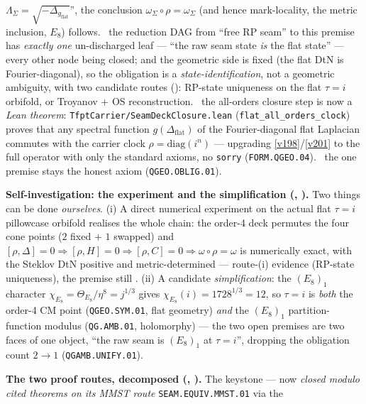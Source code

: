 $\Lambda_\Sigma=\sqrt{-\Delta_{g_{\mathrm{flat}}}}$'', the conclusion $\omega_\Sigma\circ\rho=\omega_\Sigma$ (and
hence mark-locality, the metric inclusion, $E_8$) follows. \mE\ the reduction DAG from ``free RP seam'' to this
premise has \emph{exactly one} un-discharged leaf --- ``the raw seam state \emph{is} the flat state'' --- every
other node being closed; and the geometric side is fixed (the flat DtN is Fourier-diagonal), so the obligation is
a \emph{state-identification}, not a geometric ambiguity, with two candidate routes (\mC): RP-state uniqueness on
the flat $\tau{=}i$ orbifold, or Troyanov $+$ OS reconstruction. \mE\ the all-orders closure step is now a
\emph{Lean theorem}: \texttt{TfptCarrier/SeamDeckClosure.lean} (\texttt{flat\_all\_orders\_clock}) proves that any
spectral function $g(\Delta_{\mathrm{flat}})$ of the Fourier-diagonal flat Laplacian commutes with the carrier
clock $\rho=\mathrm{diag}(i^n)$ --- upgrading \vref{v198}/\vref{v201} to the full operator with only the standard
axioms, no \texttt{sorry} (\texttt{FORM.QGEO.04}). \mO\ the one premise stays the honest axiom
(\texttt{QGEO.OBLIG.01}).
\par\smallskip\noindent\textbf{Self-investigation: the experiment and the simplification
(, ).} Two things can be done
\emph{ourselves}. (i) A direct numerical experiment on the actual flat $\tau{=}i$ pillowcase orbifold realises
the whole chain: the order-4 deck permutes the four cone points ($2$ fixed $+$ $1$ swapped) and
$[\rho,\Delta]{=}0\Rightarrow[\rho,H]{=}0\Rightarrow[\rho,C]{=}0\Rightarrow\omega\circ\rho{=}\omega$ is
numerically exact, with the Steklov DtN positive and metric-determined --- route-(i) evidence (RP-state
uniqueness), the premise still \mO. (ii) A candidate \emph{simplification}: the $(E_8)_1$ character
$\chi_{E_8}=\Theta_{E_8}/\eta^8=j^{1/3}$ gives $\chi_{E_8}(i)=1728^{1/3}=12$, so $\tau{=}i$ is \emph{both} the
order-4 CM point (\texttt{QGEO.SYM.01}, flat geometry) \emph{and} the $(E_8)_1$ partition-function modulus
(\texttt{QG.AMB.01}, holomorphy) --- the two open premises are two faces of one object, ``the raw seam is
$(E_8)_1$ at $\tau{=}i$'', dropping the obligation count $2\to1$ (\texttt{QGAMB.UNIFY.01}).
\par\smallskip\noindent\textbf{The two proof routes, decomposed (,
).} The keystone --- now \emph{closed modulo cited theorems on its
MMST route} \texttt{SEAM.EQUIV.MMST.01} via the
